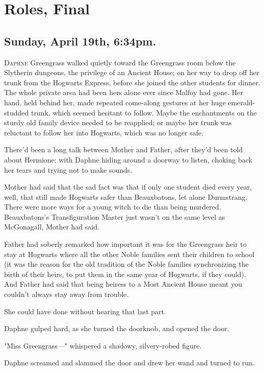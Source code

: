 \chapter{Roles, Final}

\section{Sunday, April 19th, 6:34pm.}

\lettrine{D}{aphne} Greengrass walked quietly toward the Greengrass room below the Slytherin
dungeons, the privilege of an Ancient House; on her way to drop off her trunk
from the Hogwarts Express, before she joined the other students for dinner. The
whole private area had been hers alone ever since Malfoy had gone. Her hand,
held behind her, made repeated come-along gestures at her huge emerald-studded
trunk, which seemed hesitant to follow. Maybe the enchantments on the sturdy
old family device needed to be reapplied; or maybe her trunk was reluctant to
follow her into Hogwarts, which was no longer safe.

There'd been a long talk between Mother and Father, after they'd been told
about Hermione; with Daphne hiding around a doorway to listen, choking back her
tears and trying not to make sounds.

Mother had said that the sad fact was that if only one student died every year,
well, that still made Hogwarts safer than Beauxbatons, let alone Durmstrang.
There were more ways for a young witch to die than being murdered.
Beauxbatons's Transfiguration Master just wasn't on the same level as
McGonagall, Mother had said.

Father had soberly remarked how important it was for the Greengrass heir to
stay at Hogwarts where all the other Noble families sent their children to
school (it was the reason for the old tradition of the Noble families
synchronizing the birth of their heirs, to put them in the same year of
Hogwarts, if they could). And Father had said that being heiress to a Most
Ancient House meant you couldn't always stay away from trouble.

She could have done without hearing that last part.

Daphne gulped hard, as she turned the doorknob, and opened the door.

"Miss Greengrass---" whispered a shadowy, silvery-robed figure.

Daphne screamed and slammed the door and drew her wand and turned to run.

